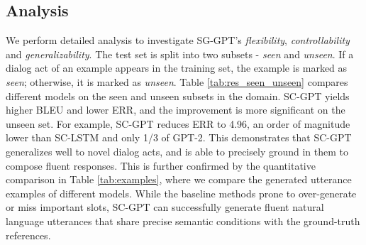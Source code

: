 \documentclass[11pt,a4paper]{article}
\begin{document}
\subsection{Analysis}
\begin{table}[t!]
\footnotesize
\centering
{}
\caption{Performance of different methods on seen DAs and unseen DAs in restaurant domain.} 
\label{tab:res_seen_unseen}
\end{table}

We perform detailed analysis to investigate  SG-GPT's \textit{flexibility}, \textit{controllability} and \textit{generalizability}. 
The test set is split into two subsets - \textit{seen} and \textit{unseen}. If a dialog act of an example appears in the training set, the example is marked as \textit{seen}; otherwise, it is marked as \textit{unseen}. Table \ref{tab:res_seen_unseen} compares different models on the seen and unseen subsets in the  domain. SC-GPT yields higher BLEU and lower ERR, and the improvement is more significant on the unseen set. 
For example, SC-GPT reduces ERR to 4.96, an order of magnitude lower than SC-LSTM and only 1/3 of GPT-2. This demonstrates that SC-GPT generalizes well to novel dialog acts, and is able to precisely ground in them to compose fluent responses.
This is further confirmed by the quantitative comparison in Table \ref{tab:examples},  where we compare the generated utterance examples of different models. While the baseline methods prone to over-generate or miss important slots, SC-GPT can successfully generate fluent natural language utterances that share precise semantic conditions with the ground-truth references.
\end{document}

